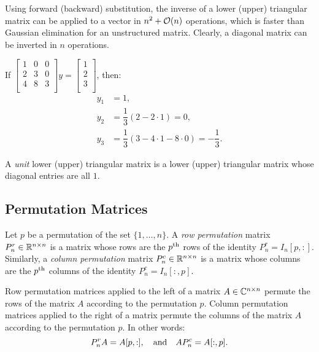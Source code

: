 Using forward (backward) substitution, the inverse of a lower (upper) triangular matrix can be applied to a vector in $n^2+\mathcal{O}(n)$ operations, which is faster than Gaussian elimination for an unstructured matrix. Clearly, a diagonal matrix can be inverted in $n$ operations.

\begin{example}
If $\begin{bmatrix} 1 &0&0\\ 2&3&0\\4&8&3\\\end{bmatrix}y = \begin{bmatrix}1\\2\\3\\\end{bmatrix}$, then:
\begin{align*}
y_1 & = 1,\\
y_2 & = \dfrac{1}{3}\left(2 - 2\cdot1\right) = 0,\\
y_3 & = \dfrac{1}{3}\left(3 - 4\cdot1-8\cdot0\right) = -\dfrac{1}{3}.
\end{align*}
\end{example}

\begin{definition}
A {\em unit} lower (upper) triangular matrix is a lower (upper) triangular matrix whose diagonal entries are all $1$.
\end{definition}

\subsection{Permutation Matrices}

\begin{definition}
Let $p$ be a permutation of the set $\{1,\ldots,n\}$. A {\em row permutation} matrix $P_n^r\in\mathbb{R}^{n\times n}$ is a matrix whose rows are the $p^{\rm th}$ rows of the identity $P_n^r = I_n[p,:]$. Similarly, a {\em column permutation} matrix $P_n^c\in\mathbb{R}^{n\times n}$ is a matrix whose columns are the $p^{\rm th}$ columns of the identity $P_n^c = I_n[:,p]$.
\end{definition}

Row permutation matrices applied to the left of a matrix $A\in\mathbb{C}^{n\times n}$ permute the rows of the matrix $A$ according to the permutation $p$. Column permutation matrices applied to the right of a matrix permute the columns of the matrix $A$ according to the permutation $p$. In other words:
\[
P_n^rA = A[p,:],\quad{\rm and}\quad AP_n^c = A[:,p].
\]

